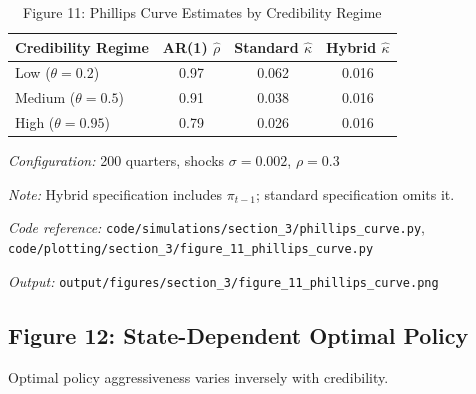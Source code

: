\documentclass[11pt]{article}
\begin{document}
\begin{table}[htbp]
\centering
\caption{Figure 11: Phillips Curve Estimates by Credibility Regime}
\label{tab:pc_estimation}
\begin{threeparttable}
\begin{tabular}{lccc}
\toprule
Credibility Regime & AR(1) $\hat{\rho}$ & Standard $\hat{\kappa}$ & Hybrid $\hat{\kappa}$ \\
\midrule
Low ($\theta = 0.2$) & 0.97 & 0.062 & 0.016 \\
Medium ($\theta = 0.5$) & 0.91 & 0.038 & 0.016 \\
High ($\theta = 0.95$) & 0.79 & 0.026 & 0.016 \\
\bottomrule
\end{tabular}
\begin{tablenotes}
\small
\item \textit{Configuration:} 200 quarters, shocks $\sigma = 0.002$, $\rho = 0.3$
\item \textit{Note:} Hybrid specification includes $\pi_{t-1}$; standard specification omits it.
\item \textit{Code reference:} \texttt{code/simulations/section\_3/phillips\_curve.py}, \texttt{code/plotting/section\_3/figure\_11\_phillips\_curve.py}
\item \textit{Output:} \texttt{output/figures/section\_3/figure\_11\_phillips\_curve.png}
\end{tablenotes}
\end{threeparttable}
\end{table}

\subsection{Figure 12: State-Dependent Optimal Policy}

Optimal policy aggressiveness varies inversely with credibility.
\end{document}
